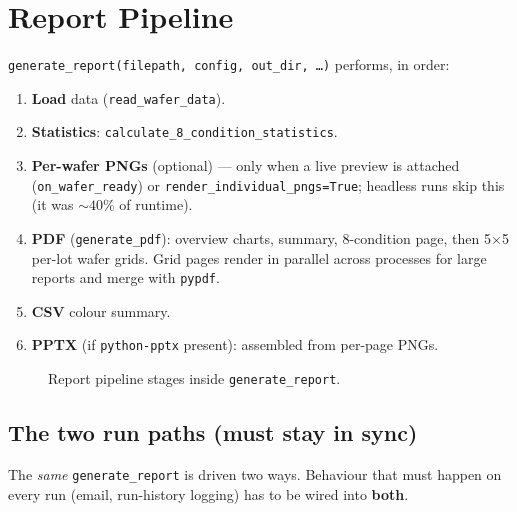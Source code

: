 \documentclass[11pt,a4paper]{article}
\newcommand{\code}[1]{\texttt{#1}}
\begin{document}
\section{Report Pipeline}
\code{generate_report(filepath, config, out_dir, \dots)} performs, in order:
\begin{enumerate}[nosep,leftmargin=1.6em]
\item \textbf{Load} data (\code{read_wafer_data}).
\item \textbf{Statistics}: \code{calculate_8_condition_statistics}.
\item \textbf{Per-wafer PNGs} (optional) --- only when a live preview is attached
(\code{on_wafer_ready}) or \code{render_individual_pngs=True}; headless runs skip
this (it was ${\sim}40\%$ of runtime).
\item \textbf{PDF} (\code{generate_pdf}): overview charts, summary, 8-condition page,
then 5$\times$5 per-lot wafer grids. Grid pages render in parallel across
processes for large reports and merge with \texttt{pypdf}.
\item \textbf{CSV} colour summary.
\item \textbf{PPTX} (if \texttt{python-pptx} present): assembled from per-page PNGs.
\end{enumerate}

\begin{figure}[h]\centering
{}
\caption{Report pipeline stages inside \texttt{generate\_report}.}
\end{figure}

\subsection{The two run paths (must stay in sync)}
The \emph{same} \code{generate_report} is driven two ways. Behaviour that must
happen on every run (email, run-history logging) has to be wired into
\textbf{both}.
\end{document}
